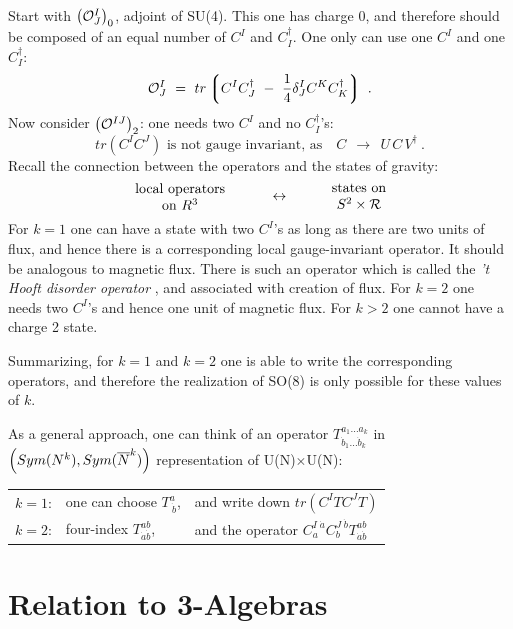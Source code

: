 \documentclass[12pt]{article}
\begin{document}
Start with $ \left(\mathcal{O}^I_J\right)_0 $, adjoint of SU(4). 
This one has charge 0, and therefore should be composed of an equal number of $ C^I $ and $ C_I^\dag $. 
One only can use one $ C^I $ and one $ C_I^\dag $:
\[
	\mathcal{O}^I_J ~=~ tr \left\lgroup C^I C_J^\dag ~-~ \frac{1}{4} \delta^I_J C^K C_K^\dag \right\rgroup~.
\]
Now consider $ \left(\mathcal{O}^{IJ}\right)_2 $: one needs two $ C^I $ and no $ C_I^\dag $'s:
\[
	tr \left( C^I C^J \right )  \text{ is not gauge invariant, as} \quad C ~~\to~~ U\, C\, V^\dag~.
\]
Recall the connection between the operators and the states of gravity:
\[
	\parbox{4.0cm}{\centering local operators\\ on $ R^3 $} ~~\leftrightarrow~~
	\parbox{3.0cm}{\centering states on\\ $ S^2\times \mc{R} $} 
\]
For $ k = 1 $ one can have a state with two $ C^I $'s as long as there are two units of flux, and hence
there is a corresponding local gauge-invariant operator.
It should be analogous to magnetic flux.
There is such an operator which is called the {\it 't Hooft disorder operator} \cite{'tHooft:1977hy},
and associated with creation of flux.
For $ k = 2 $ one needs two $ C^I $'s and hence one unit of magnetic flux.  
For $ k > 2 $ one cannot have a charge 2 state.

Summarizing, for $ k=1 $ and $ k=2 $ one is able to write the corresponding operators, and therefore
the realization of SO(8) is only possible for these values of $ k $.

As a general approach, one can think of an operator $ T_{\dot{b}_1\dots\dot{b}_k}^{a_1\dots a_k} $ in
$ \left( Sym(N^k), Sym(\overline{N}^k) \right) $ representation of U(N)$\times$U(N):
\begin{center}
\begin{tabular}{lll}
  $ k = 1 $:\qquad   & one can choose $ T^a_{\ \dot{b}} $,  & and write down $ tr \left(C^I T C^J T \right) $ \\
  $ k = 2 $:\qquad   & four-index $ T^{ab}_{\dot{a}\dot{b}} $, & and the operator $ C^{I\;\dot{a}}_a C^{J\;\dot{b}}_b T^{ab}_{\dot{a}\dot{b}} $
\end{tabular}
\end{center}

\section{Relation to 3-Algebras}
\end{document}
